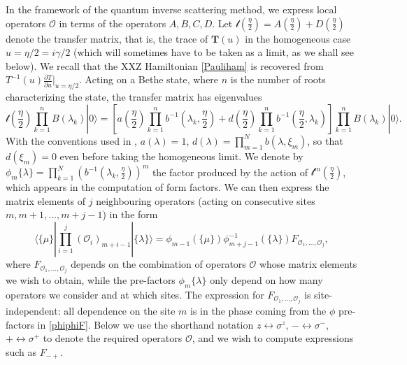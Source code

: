 \documentclass[a4paper,10pt]{article}
\begin{document}
In the framework of the quantum inverse scattering method, we express local operators $\mathcal{O}$ in terms of the operators $A,B,C,D$. Let $\mathcal{t}(\frac{\eta}{2}) = A(\frac{\eta}{2}) + D(\frac{\eta}{2})$ denote the transfer matrix, that is, the trace of $\mathbf{T}(u)$ in the homogeneous case $u=\eta/2=i\gamma/2$ (which will sometimes have to be taken as a limit, as we shall see below). 
We recall that the XXZ Hamiltonian \eqref{Pauliham} is recovered from $T^{-1}(u) \frac{\partial T}{\partial u}\Big|_{u=\eta/2}$.
%
Acting on a Bethe state, where $n$ is the number of roots characterizing the state, the transfer matrix has eigenvalues
\begin{equation}
\mathcal{t}\left(\frac{\eta}{2}\right)\prod_{k=1}^n B(\lambda_k)|0\rangle =
%
\left[ 
a\left(\frac{\eta}{2}\right) \prod_{k=1}^n b^{-1}\left(\lambda_k,\frac{\eta}{2}\right)
+ d\left(\frac{\eta}{2}\right)\prod_{k=1}^n b^{-1}\left(\frac{\eta}{2},\lambda_k\right) \right]
\prod_{k=1}^n B(\lambda_k)|0\rangle.
%
\end{equation}
With the conventions used in \cite{Terras}, $a(\lambda)=1,\,d(\lambda)=\prod_{m=1}^N b(\lambda,\xi_m)$, so that $d(\xi_m)=0$ even before taking the homogeneous limit. We denote by %
$\phi_m\{\lambda\}=\prod_{k=1}^N \left( b^{-1}\left(\lambda_k,\frac{\eta}{2}\right)   \right)^m$ the factor produced by the action of $\mathcal{t}^m \! \left(\frac{\eta}{2}\right)$, which appears in the computation of form factors. We can then express the matrix elements of $j$ neighbouring operators (acting on consecutive sites $m, m+1,\ldots,m+j-1$) in the form
\begin{equation} \label{phiphiF}
 \langle \{\mu\}|\prod_{i=1}^j ({\mathcal{O}_i})_{m+i-1}|\{\lambda\}\rangle = \phi_{m-1}(\{\mu\}) \phi^{-1}_{m+j-1}(\{\lambda\}) F_{{\mathcal{O}}_1,\ldots,{\mathcal{O}}_j}  ,
\end{equation}
where $F_{\mathcal{O}_1,\ldots,\mathcal{O}_j}$ depends on the combination of operators $\mathcal{O}$  whose matrix elements we wish to obtain, while the pre-factors $\phi_m\{\lambda\}$ only depend on how many operators we consider and at which sites. The expression for $F_{\mathcal{O}_1,\ldots,\mathcal{O}_j}$ is site-independent: all dependence on the site $m$ is in the phase coming from the $\phi$ pre-factors in \eqref{phiphiF}. Below we use the shorthand notation $z\leftrightarrow \sigma^z$, $-\leftrightarrow \sigma^-$, $+\leftrightarrow \sigma^+$ to denote the required operators $\mathcal{O}$, and we wish to compute expressions such as $F_{-+}$. 
\end{document}
